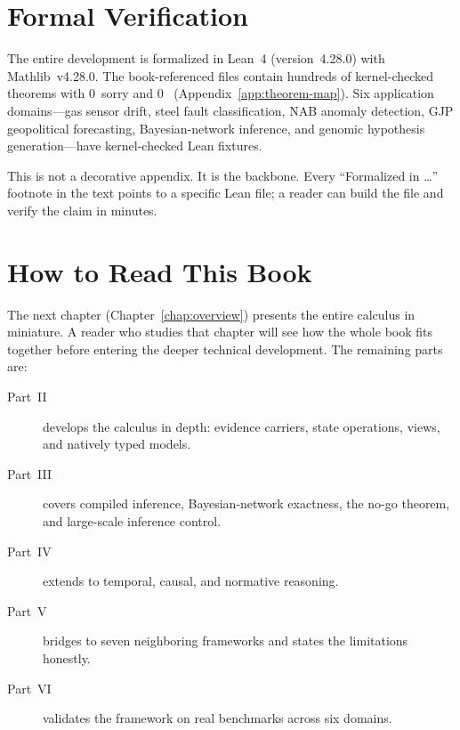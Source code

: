 \documentclass[11pt,openany]{report}
\begin{document}


\section{Formal Verification}

The entire development is formalized in Lean~4 (version~4.28.0)
with Mathlib~v4.28.0.  The book-referenced files contain
hundreds of kernel-checked theorems with 0~sorry and 0~
(Appendix~\ref{app:theorem-map}).  Six application domains---gas
sensor drift, steel fault classification, NAB anomaly detection,
GJP geopolitical forecasting, Bayesian-network inference, and
genomic hypothesis generation---have kernel-checked Lean fixtures.

This is not a decorative appendix.  It is the backbone.
Every ``Formalized in \ldots'' footnote in the text points to a
specific Lean file; a reader can build the file and verify the
claim in minutes.


\section{How to Read This Book}

The next chapter (Chapter~\ref{chap:overview}) presents the
entire calculus in miniature.  A reader who studies that chapter
will see how the whole book fits together before entering the
deeper technical development.  The remaining parts are:

\begin{description}
\item[Part~II] develops the calculus in depth: evidence
  carriers, state operations, views, and natively typed models.
\item[Part~III] covers compiled inference, Bayesian-network
  exactness, the no-go theorem, and large-scale inference control.
\item[Part~IV] extends to temporal, causal, and normative
  reasoning.
\item[Part~V] bridges to seven neighboring frameworks and states
  the limitations honestly.
\item[Part~VI] validates the framework on real benchmarks across
  six domains.
\end{description}
\end{document}
